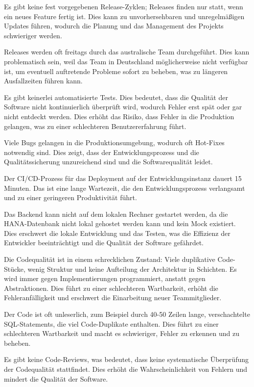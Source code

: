 Es gibt keine fest vorgegebenen Release-Zyklen; Releases finden nur statt, 
wenn ein neues Feature fertig ist. Dies kann zu unvorhersehbaren und unregelmäßigen Updates führen,
wodurch die Planung und das Management des Projekts schwieriger werden.

Releases werden oft freitags durch das australische Team durchgeführt. 
Dies kann problematisch sein, weil das Team in Deutschland möglicherweise nicht verfügbar ist, 
um eventuell auftretende Probleme sofort zu beheben, was zu längeren Ausfallzeiten führen kann.

Es gibt keinerlei automatisierte Tests. Dies bedeutet, 
dass die Qualität der Software nicht kontinuierlich überprüft wird, 
wodurch Fehler erst spät oder gar nicht entdeckt werden. Dies erhöht das Risiko, 
dass Fehler in die Produktion gelangen, was zu einer schlechteren Benutzererfahrung führt.

Viele Bugs gelangen in die Produktionsumgebung, wodurch oft Hot-Fixes notwendig sind. Dies zeigt, 
dass der Entwicklungsprozess und die Qualitätssicherung unzureichend sind und die Softwarequalität leidet.

Der CI/CD-Prozess für das Deployment auf der Entwicklungsinstanz dauert 15 Minuten. 
Das ist eine lange Wartezeit, die den Entwicklungsprozess verlangsamt und zu einer geringeren Produktivität führt.

Das Backend kann nicht auf dem lokalen Rechner gestartet werden, 
da die HANA-Datenbank nicht lokal gehostet werden kann und kein Mock existiert. 
Dies erschwert die lokale Entwicklung und das Testen, 
was die Effizienz der Entwickler beeinträchtigt und die Qualität der Software gefährdet.

Die Codequalität ist in einem schrecklichen Zustand: Viele duplikative Code-Stücke, 
wenig Struktur und keine Aufteilung der Architektur in Schichten. 
Es wird immer gegen Implementierungen programmiert, anstatt gegen Abstraktionen. 
Dies führt zu einer schlechteren Wartbarkeit, 
erhöht die Fehleranfälligkeit und erschwert die Einarbeitung neuer Teammitglieder.

Der Code ist oft unleserlich, zum Beispiel durch 40-50 Zeilen lange, 
verschachtelte SQL-Statements, die viel Code-Duplikate enthalten. 
Dies führt zu einer schlechteren Wartbarkeit und macht es schwieriger, 
Fehler zu erkennen und zu beheben.

Es gibt keine Code-Reviews, was bedeutet, dass keine systematische Überprüfung der Codequalität 
stattfindet. Dies erhöht die Wahrscheinlichkeit von Fehlern und mindert die Qualität der Software.

